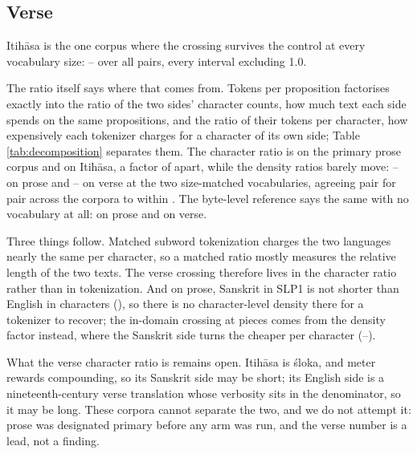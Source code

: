 \documentclass[11pt]{article}
\begin{document}


\subsection{Verse}
\label{sec:verse}

Itih\=asa is the one corpus where the crossing survives the control at every vocabulary
size: \numTppControlledItihasaAllLo--\numTppControlledItihasaAllHi{} over all
\numControlledPairsAll{} pairs, every interval excluding 1.0.

The ratio itself says where that comes from. Tokens per proposition factorises exactly into
the ratio of the two sides' character counts, how much text each side spends on the same
propositions, and the ratio of their tokens per character, how expensively each tokenizer
charges for a character of its own side; Table \ref{tab:decomposition} separates them. The
character ratio is \numCharRatioSamayik{} on the primary prose corpus and
\numCharRatioItihasa{} on Itih\=asa, a factor of \numCharRatioFactor{} apart, while the
density ratios barely move: \numDensityRatioSamayikLo--\numDensityRatioSamayikHi{} on prose
and \numDensityRatioItihasaLo--\numDensityRatioItihasaHi{} on verse at the two size-matched
vocabularies, agreeing pair for pair across the corpora to within \numDensityPairGap. The
byte-level reference says the same with no vocabulary at all: \numTSevenSamayik{} on prose
and \numTSevenItihasa{} on verse.

Three things follow. Matched subword tokenization charges the two languages nearly the same
per character, so a matched ratio mostly measures the relative length of the two texts. The
verse crossing therefore lives in the character ratio rather than in tokenization. And on
prose, Sanskrit in SLP1 is not shorter than English in characters
(\numCharRatioSamayik), so there is no character-level density there for a tokenizer to
recover; the in-domain crossing at \numVocabHuge{} pieces comes from the density factor
instead, where the Sanskrit side turns the cheaper per character
(\numDensityRatioSamayikHugeLo--\numDensityRatioSamayikHugeHi).

What the verse character ratio is remains open. Itih\=asa is \'sloka, and meter rewards
compounding, so its Sanskrit side may be short; its English side is a nineteenth-century
verse translation whose verbosity sits in the denominator, so it may be long. These corpora
cannot separate the two, and we do not attempt it: prose was designated primary before any
arm was run, and the verse number is a lead, not a finding.
\end{document}

